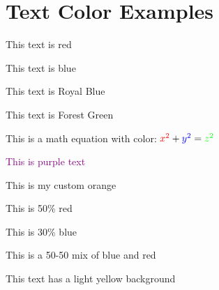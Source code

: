 \documentclass{article}
\begin{document}
\section{Text Color Examples}

{\color{red} This text is red}

{\color{blue} This text is blue}

{\color{RoyalBlue} This text is Royal Blue}

{\color{ForestGreen} This text is Forest Green}

This is a math equation with color: ${\color{red} x^2} + {\color{blue} y^2} = {\color{green} z^2}$

\textcolor{purple}{This is purple text}

\textcolor{myorange}{This is my custom orange}

{\color{red!50} This is 50\% red}

{\color{blue!30} This is 30\% blue}

{\color{blue!50!red} This is a 50-50 mix of blue and red}

\colorbox{yellow!20}{This text has a light yellow background}
\end{document}
